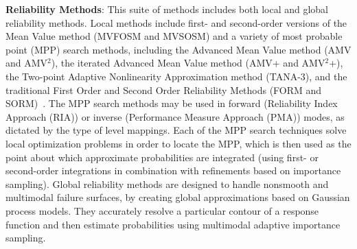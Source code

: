 \textbf{Reliability Methods}: This suite of methods includes both
local and global reliability methods. Local methods include first- and
second-order versions of the Mean Value method (MVFOSM and MVSOSM) and
a variety of most probable point (MPP) search methods, including the
Advanced Mean Value method (AMV and AMV$^2$), the iterated Advanced
Mean Value method (AMV+ and AMV$^2$+), the Two-point Adaptive
Nonlinearity Approximation method (TANA-3), and the traditional First
Order and Second Order Reliability Methods (FORM and
SORM)~\cite{Hal00}. The MPP search methods may be used in forward
(Reliability Index Approach (RIA)) or inverse (Performance Measure
Approach (PMA)) modes, as dictated by the type of level mappings. Each
of the MPP search techniques solve local optimization problems in
order to locate the MPP, which is then used as the point about which
approximate probabilities are integrated (using first- or second-order
integrations in combination with refinements based on importance
sampling).
Global reliability methods are designed to handle
nonsmooth and multimodal failure surfaces, by creating global
approximations based on Gaussian process models. They accurately
resolve a particular contour of a response function and then estimate
probabilities using multimodal adaptive importance sampling.


